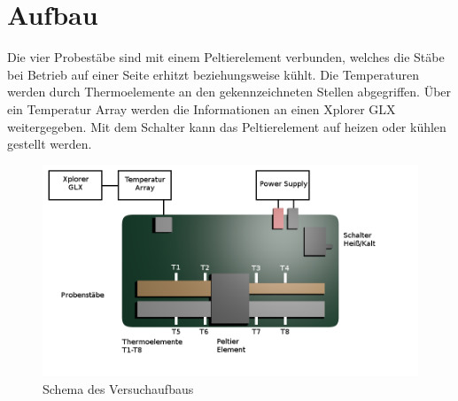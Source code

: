 \section{Aufbau}
\label{sec:Aufbau}

Die vier Probestäbe sind mit einem Peltierelement verbunden, welches die Stäbe bei Betrieb auf einer Seite erhitzt beziehungsweise kühlt. Die Temperaturen werden durch Thermoelemente an den gekennzeichneten Stellen abgegriffen. Über ein Temperatur Array werden die Informationen an einen Xplorer GLX weitergegeben. Mit dem Schalter kann das Peltierelement auf heizen oder kühlen gestellt werden.

\begin{figure}
	\centering
	\includegraphics[scale = .75,keepaspectratio]
	{content/images/Aufbau.png}
	\caption{Schema des Versuchaufbaus}
	\label{fig:Aufbau}
\end{figure}
